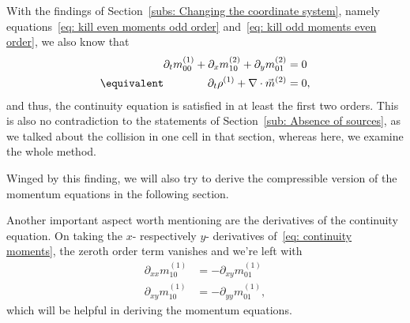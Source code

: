 With the findings of Section~\ref{subs: Changing the coordinate system},
namely equations~\eqref{eq: kill even moments odd order} and~\eqref{eq: kill odd moments even order}, we also know that
\begin{equation}
  \label{eq: conti second order}
  \begin{aligned}
    \partial_t m_{00}^{(1)} + \partial_x m_{10}^{(2)}+ \partial_y m_{01}^{(2)} &= 0
    \\   \equivalent\qquad\qquad
    \partial_t \rho^{(1)} + \nabla \cdot \vec{m}^{(2)} &= 0,
  \end{aligned}
\end{equation}
and thus, the continuity equation is satisfied in at least the first two orders.
This is also no contradiction to the statements of Section~\eqref{sub: Absence of sources}, as we talked about the collision in one cell in that section, whereas here, we examine the whole method.

Winged by this finding, we will also try to derive the compressible version of the momentum equations in the following section.

Another important aspect worth mentioning are the derivatives of the continuity equation.
On taking the $x$- respectively $y$- derivatives of~\eqref{eq: continuity moments}, the zeroth order term vanishes and we're left with
\begin{align}
  \label{eq: continuity derivative x}
  \partial_{xx} m_{10}^{(1)} & = - \partial_{xy} m_{01}^{(1)}\\
  \label{eq: continuity derivative y}
  \partial_{xy} m_{10}^{(1)} & = - \partial_{yy} m_{01}^{(1)},
\end{align}
which will be helpful in deriving the momentum equations.
